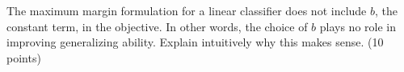 \documentclass[fleqn]{homework}
\begin{document}
  \begin{problem}{5}
    \begin{question}
      The maximum margin formulation for a linear classifier does not include
      $b$, the constant term, in the objective.  In other words, the choice of
      $b$ plays no role in improving generalizing ability.  Explain intuitively
      why this makes sense. (10 points)
    \end{question}
  \end{problem}
\end{document}
